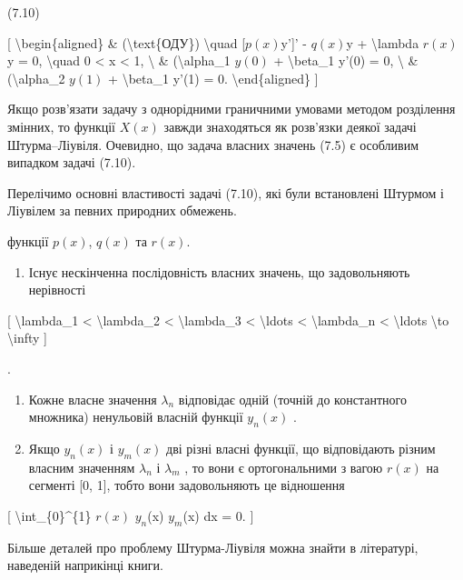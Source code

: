 \documentclass[
]{article}
\providecommand{\tightlist}{%
  \setlength{\itemsep}{0pt}\setlength{\parskip}{0pt}}
\begin{document}
{{(7.10)

{[} \textbackslash begin\{aligned\} \& (\textbackslash text\{ОДУ\})
\textbackslash quad {[}\(p(x)\)y'{]}' - \(q(x)\)y +
\textbackslash lambda \(r(x)\)y = 0, \textbackslash quad 0 \textless{} x
\textless{} 1, \textbackslash{} \& (\textbackslash alpha\_1 \(y(0)\) +
\textbackslash beta\_1 y'(0) = 0, \textbackslash{} \&
(\textbackslash alpha\_2 \(y(1)\) + \textbackslash beta\_1 y'(1) = 0.
\textbackslash end\{aligned\} {]}

Якщо розв'язати задачу з однорідними граничними умовами методом
розділення змінних, то функції \(X(x)\) завжди знаходяться як розв'язки
деякої задачі Штурма--Ліувіля. Очевидно, що задача власних значень (7.5)
є особливим випадком задачі (7.10).

Перелічимо основні властивості задачі (7.10), які були встановлені
Штурмом і Ліувілем за певних природних обмежень.

функції \(p(x)\), \(q(x)\) та \(r(x)\).

\begin{enumerate}
\def\labelenumi{\arabic{enumi}.}
\tightlist
\item
  Існує нескінченна послідовність власних значень, що задовольняють
  нерівності
\end{enumerate}

{[} \textbackslash lambda\_1 \textless{} \textbackslash lambda\_2
\textless{} \textbackslash lambda\_3 \textless{} \textbackslash ldots
\textless{} \textbackslash lambda\_n \textless{} \textbackslash ldots
\textbackslash to \textbackslash infty {]}

.

\begin{enumerate}
\def\labelenumi{\arabic{enumi}.}
\setcounter{enumi}{1}
\item
  Кожне власне значення \(\lambda_n\) відповідає одній (точній до
  константного множника) ненульовій власній функції \(y_n(x)\) .
\item
  Якщо \(y_n(x)\) і \(y_m(x)\) дві різні власні функції, що відповідають
  різним власним значенням \(\lambda_n\) і \(\lambda_m\) , то вони є
  ортогональними з вагою \(r(x)\) на сегменті {[}0, 1{]}, тобто вони
  задовольняють це відношення
\end{enumerate}

{[} \textbackslash int\_\{0\}\^{}\{1\} \(r(x)\) \(y_{n}\)(x)
\(y_{m}\)(x) dx = 0. {]}

Більше деталей про проблему Штурма-Ліувіля можна знайти в літературі,
наведеній наприкінці книги.

}}
\end{document}
